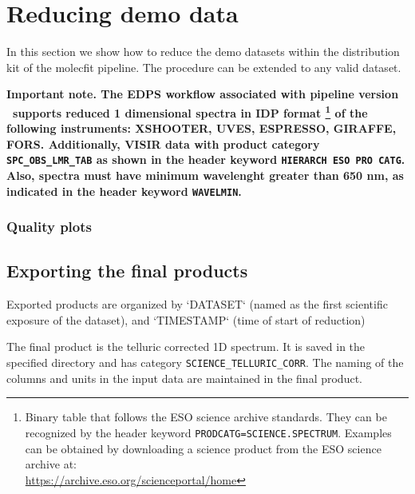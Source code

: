 
\section{Reducing demo data}
\label{sec:reducing_demo_data}
In this section we show how to reduce the demo datasets within the
distribution kit of the molecfit pipeline. The procedure can be
extended to any valid dataset.

{\bf Important note. The EDPS workflow associated with pipeline
version \pipelinevers\ supports reduced 1 dimensional spectra in IDP
format \footnote{Binary table that follows the ESO science archive
standards. They can be recognized by the header keyword {\tt PRODCATG=SCIENCE.SPECTRUM}. Examples can be obtained by downloading a
science product from the ESO science archive at:\\
\url{https://archive.eso.org/scienceportal/home}} of the following
instruments: XSHOOTER, UVES, ESPRESSO, GIRAFFE, FORS. Additionally,
VISIR data with product category {\tt SPC\_OBS\_LMR\_TAB} as shown in
the header keyword {\tt HIERARCH ESO PRO CATG}. Also, spectra must
have minimum wavelenght greater than 650 nm, as indicated in the
header keyword {\tt WAVELMIN}.}



 
\subsubsection{Quality plots}
\label{sec:quality_plots}


\subsection{Exporting the final products}
\label{sec:export_final_products}



 
 
Exported products are organized by `DATASET` (named as the first
scientific exposure of the dataset), and `TIMESTAMP` (time of start of
reduction)

The final product is the telluric corrected 1D spectrum. It is saved in the specified directory and has category {\tt SCIENCE\_TELLURIC\_CORR}.
The naming of the columns and units in the input data are maintained in the final product.


